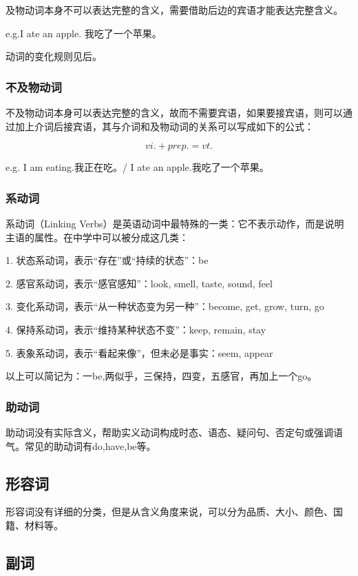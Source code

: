 \documentclass[UTF8]{ctexbook}
\begin{document}
及物动词本身不可以表达完整的含义，需要借助后边的宾语才能表达完整含义。

e.g.I ate an apple. 我吃了一个苹果。

动词的变化规则见后。

\subsubsection{不及物动词}

不及物动词本身可以表达完整的含义，故而不需要宾语，如果要接宾语，则可以通过加上介词后接宾语，其与介词和及物动词的关系可以写成如下的公式：

\[
vi.+prep.=vt.
\]

e.g. I am eating.我正在吃。/ I ate an apple.我吃了一个苹果。 

\subsubsection{系动词}

系动词（Linking Verbs）是英语动词中最特殊的一类：它不表示动作，而是说明主语的属性。在中学中可以被分成这几类：

1. 状态系动词，表示“存在”或“持续的状态”：be

2. 感官系动词，表示“感官感知”：look, smell, taste, sound, feel	

3. 变化系动词，表示“从一种状态变为另一种”：become, get, grow, turn, go	

4. 保持系动词，表示“维持某种状态不变”：keep, remain, stay	

5. 表象系动词，表示“看起来像”，但未必是事实：seem, appear

以上可以简记为：一be,两似乎，三保持，四变，五感官，再加上一个go。

\subsubsection{助动词}

助动词没有实际含义，帮助实义动词构成时态、语态、疑问句、否定句或强调语气。常见的助动词有do,have,be等。

\subsection{形容词}

形容词没有详细的分类，但是从含义角度来说，可以分为品质、大小、颜色、国籍、材料等。

\subsection{副词}
\end{document}
